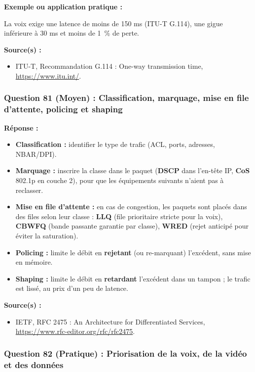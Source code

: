 \documentclass[12pt,a4paper]{article}
\newcommand{\reponse}{\textbf{Réponse :}\par}
\newcommand{\exemple}{\textbf{Exemple ou application pratique :}\par}
\newcommand{\sources}{\textbf{Source(s) :}}
\begin{document}
\exemple
La voix exige une latence de moins de 150 ms (ITU-T G.114), une gigue
inférieure à 30 ms et moins de 1~\% de perte.

\sources
\begin{itemize}
    \item ITU-T, Recommandation G.114 : One-way transmission time,
    \url{https://www.itu.int/}.
\end{itemize}

\subsubsection*{Question 81 (Moyen) : Classification, marquage, mise en file d'attente, policing et shaping}

\reponse
\begin{itemize}
    \item \textbf{Classification :} identifier le type de trafic (ACL,
    ports, adresses, NBAR/DPI).
    \item \textbf{Marquage :} inscrire la classe dans le paquet
    (\textbf{DSCP} dans l'en-tête IP, \textbf{CoS} 802.1p en couche 2),
    pour que les équipements suivants n'aient pas à reclasser.
    \item \textbf{Mise en file d'attente :} en cas de congestion, les
    paquets sont placés dans des files selon leur classe :
    \textbf{LLQ} (file prioritaire stricte pour la voix), \textbf{CBWFQ}
    (bande passante garantie par classe), \textbf{WRED} (rejet anticipé
    pour éviter la saturation).
    \item \textbf{Policing :} limite le débit en \textbf{rejetant} (ou
    re-marquant) l'excédent, sans mise en mémoire.
    \item \textbf{Shaping :} limite le débit en \textbf{retardant}
    l'excédent dans un tampon ; le trafic est lissé, au prix d'un peu de
    latence.
\end{itemize}

\sources
\begin{itemize}
    \item IETF, RFC 2475 : An Architecture for Differentiated Services,
    \url{https://www.rfc-editor.org/rfc/rfc2475}.
\end{itemize}

\subsubsection*{Question 82 (Pratique) : Priorisation de la voix, de la vidéo et des données}
\end{document}
